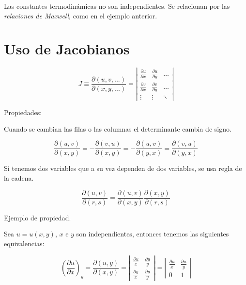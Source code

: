 \documentclass[10pt,twocolumn]{IEEEtran2e}
\begin{document}
Las constantes termodin\'amicas no son independientes. Se relacionan por las \textit{relaciones de Maxwell}, como en el ejemplo anterior.

\section{Uso de Jacobianos}
\begin{equation}
 J\equiv \frac{\partial (u,v,...)}{\partial (x,y,...)}=
\left| \begin{array}{ccc}
\frac{\partial u}{\partial x} & \frac{\partial u}{\partial y} & \ldots \\
\frac{\partial v}{\partial x} & \frac{\partial v}{\partial y} & \ldots \\
\vdots               & \vdots               & \ddots
\end{array} \right|
\end{equation}

\noindent Propiedades: 

Cuando se cambian las filas o las columnas el determinante cambia de signo.

\begin{equation}
 \frac{\partial (u,v)}{\partial (x,y)} = - \frac{\partial (v,u)}{\partial (x,y)} = - \frac{\partial (u,v)}{\partial (y,x)} = \frac{\partial (v,u)}{\partial (y,x)}
\end{equation}

Si tenemos dos variables que a su vez dependen de dos variables, se usa regla de la cadena.

\begin{equation}
 \frac{\partial (u,v)}{\partial (r,s)}=\frac{\partial (u,v)}{\partial (x,y)} \frac{\partial (x,y)}{\partial (r,s)}
\end{equation}

\noindent Ejemplo de propiedad. 

Sea $u = u(x,y)$, $x$ e $y$ son independientes, entonces tenemos las siguientes equivalencias:

\begin{equation}
\left(\frac{\partial u}{\partial x} \right)_{y} = \frac{\partial (u,y)}{\partial (x,y)}=
\left| \begin{array}{cc}
\frac{\partial u}{x} & \frac{\partial u}{y} \\
\frac{\partial y}{x} & \frac{\partial y}{y}
\end{array} \right| =
\left| \begin{array}{cc}
\frac{\partial u}{x} & \frac{\partial u}{y} \\
0                    & 1
\end{array} \right|
\end{equation}
\end{document}
